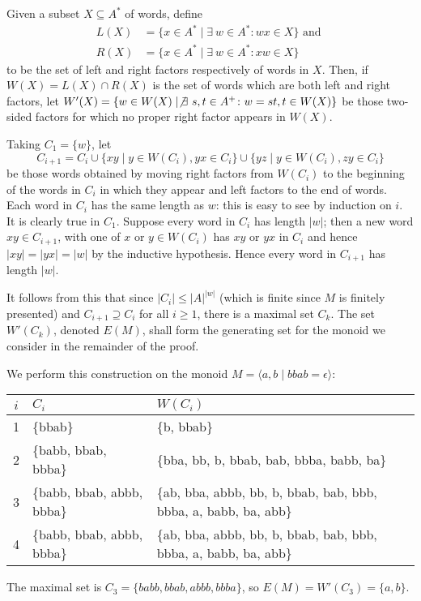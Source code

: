 \documentclass[libertine,widepage,nosubthm]{lmaths}
\begin{document}
Given a subset $X \subseteq A^*$ of words, define
	\begin{align*}
		L(X) &= \{ x \in A^* \mid \exists\ w \in A^* \colon wx \in X \} \text{ and } \\
		R(X) &= \{ x \in A^* \mid \exists\ w \in A^* \colon xw \in X \}
	\end{align*}
to be the set of left and right factors respectively of words in $X$. Then, if $W(X) = L(X) \cap R(X)$ is the set of words which are both left and right factors, let $W'(X) = \{ w \in W(X) \mid \not\exists\ s, t \in A^+ \colon w = st, t \in W(X) \}$ be those two-sided factors for which no proper right factor appears in $W(X)$.

Taking $C_1 = \{w\}$, let
	\[ C_{i+1} = C_i \cup \{ xy \mid y \in W(C_i), yx \in C_i \} \cup \{ yz \mid y \in W(C_i), zy \in C_i \} \]
be those words obtained by moving right factors from $W(C_i)$ to the beginning of the words in $C_i$ in which they appear and left factors to the end of words. Each word in $C_i$ has the same length as $w$: this is easy to see by induction on $i$. It is clearly true in $C_1$. Suppose every word in $C_i$ has length $|w|$; then a new word $xy \in C_{i+1}$, with one of $x$ or $y \in W(C_i)$ has $xy$ or $yx$ in $C_i$ and hence $|xy| = |yx| = |w|$ by the inductive hypothesis. Hence every word in $C_{i+1}$ has length $|w|$.

It follows from this that since $|C_i| \le |A|^{|w|}$ (which is finite since $M$ is finitely presented) and $C_{i+1} \supseteq C_i$ for all $i \ge 1$, there is a maximal set $C_k$. The set $W'(C_k)$, denoted $E(M)$, shall form the generating set for the monoid we consider in the remainder of the proof.

\begin{example}
	We perform this construction on the monoid $M = \langle a, b \mid bbab = \epsilon \rangle$:

	\begin{center}
	\begin{tabular}{c|ll}
		$i$ & $C_i$ & $W(C_i)$ \\
		\hline
		1 & \{bbab\} & \{b, bbab\} \\
		2 & \{babb, bbab, bbba\} & \{bba, bb, b, bbab, bab, bbba, babb, ba\} \\
		3 & \{babb, bbab, abbb, bbba\} & \{ab, bba, abbb, bb, b, bbab, bab, bbb, bbba, a, babb, ba, abb\} \\
		4 & \{babb, bbab, abbb, bbba\} & \{ab, bba, abbb, bb, b, bbab, bab, bbb, bbba, a, babb, ba, abb\}
	\end{tabular}
	\end{center}

	The maximal set is $C_3 = \{babb, bbab, abbb, bbba\}$, so $E(M) = W'(C_3) = \{a, b\}$.
\end{example}
\end{document}
